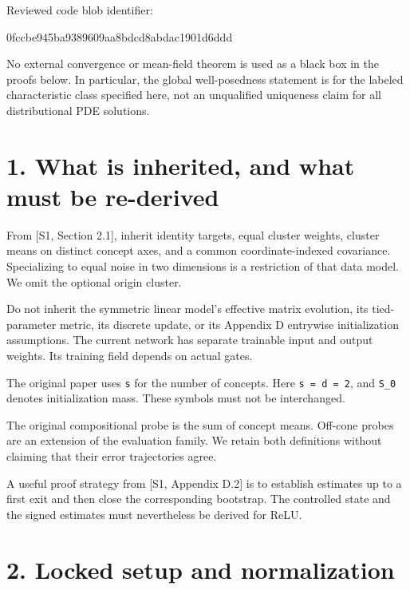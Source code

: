 \documentclass[
  10pt,
]{article}
\newenvironment{Shaded}{}{}
\newcommand{\NormalTok}[1]{#1}
\begin{document}
Reviewed code blob identifier:

\begin{Shaded}
\begin{Highlighting}[]
\NormalTok{0fccbe945ba9389609aa8bdcd8abdac1901d6ddd}
\end{Highlighting}
\end{Shaded}

No external convergence or mean-field theorem is used as a black box in
the proofs below. In particular, the global well-posedness statement is
for the labeled characteristic class specified here, not an unqualified
uniqueness claim for all distributional PDE solutions.

\section{1. What is inherited, and what must be
re-derived}\label{what-is-inherited-and-what-must-be-re-derived}

From {[}S1, Section 2.1{]}, inherit identity targets, equal cluster
weights, cluster means on distinct concept axes, and a common
coordinate-indexed covariance. Specializing to equal noise in two
dimensions is a restriction of that data model. We omit the optional
origin cluster.

Do not inherit the symmetric linear model's effective matrix evolution,
its tied-parameter metric, its discrete update, or its Appendix D
entrywise initialization assumptions. The current network has separate
trainable input and output weights. Its training field depends on actual
gates.

The original paper uses \texttt{s} for the number of concepts. Here
\texttt{s\ =\ d\ =\ 2}, and \texttt{S\_0} denotes initialization mass.
These symbols must not be interchanged.

The original compositional probe is the sum of concept means. Off-cone
probes are an extension of the evaluation family. We retain both
definitions without claiming that their error trajectories agree.

A useful proof strategy from {[}S1, Appendix D.2{]} is to establish
estimates up to a first exit and then close the corresponding bootstrap.
The controlled state and the signed estimates must nevertheless be
derived for ReLU.

\section{2. Locked setup and
normalization}\label{locked-setup-and-normalization}
\end{document}
